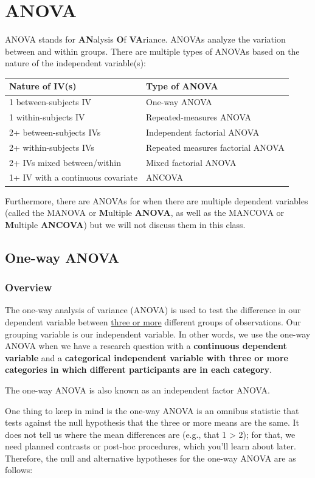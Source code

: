\documentclass[
]{book}
\begin{document}
\hypertarget{anova}{%
\chapter{ANOVA}\label{anova}}

ANOVA stands for \textbf{AN}alysis \textbf{O}f \textbf{VA}riance. ANOVAs analyze the variation between and within groups. There are multiple types of ANOVAs based on the nature of the independent variable(s):

\begin{longtable}[]{@{}ll@{}}
\toprule
\textbf{Nature of IV(s)} & \textbf{Type of ANOVA}\tabularnewline
\midrule
\endhead
1 between-subjects IV & One-way ANOVA\tabularnewline
1 within-subjects IV & Repeated-measures ANOVA\tabularnewline
2+ between-subjects IVs & Independent factorial ANOVA\tabularnewline
2+ within-subjects IVs & Repeated measures factorial ANOVA\tabularnewline
2+ IVs mixed between/within & Mixed factorial ANOVA\tabularnewline
1+ IV with a continuous covariate & ANCOVA\tabularnewline
\bottomrule
\end{longtable}

Furthermore, there are ANOVAs for when there are multiple dependent variables (called the MANOVA or \textbf{M}ultiple \textbf{ANOVA}, as well as the MANCOVA or \textbf{M}ultiple \textbf{ANCOVA}) but we will not discuss them in this class.

\hypertarget{one-way-anova}{%
\section{One-way ANOVA}\label{one-way-anova}}

\hypertarget{overview-6}{%
\subsection{Overview}\label{overview-6}}

The one-way analysis of variance (ANOVA) is used to test the difference in our dependent variable between \underline{three or more} different groups of observations. Our grouping variable is our independent variable. In other words, we use the one-way ANOVA when we have a research question with a \textbf{continuous dependent variable} and a \textbf{categorical independent variable with three or more categories in which different participants are in each category}.

The one-way ANOVA is also known as an independent factor ANOVA.

One thing to keep in mind is the one-way ANOVA is an omnibus statistic that tests against the null hypothesis that the three or more means are the same. It does not tell us where the mean differences are (e.g., that 1 \textgreater{} 2); for that, we need planned contrasts or post-hoc procedures, which you'll learn about later. Therefore, the null and alternative hypotheses for the one-way ANOVA are as follows:
\end{document}
